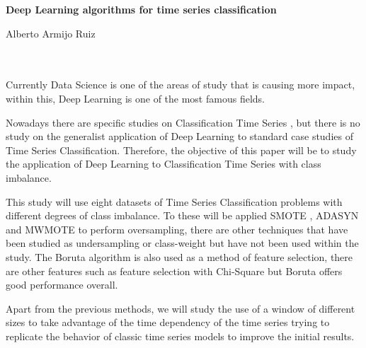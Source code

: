 {\cleardoublepage


\thispagestyle{empty}


\begin{center}
{\large\bfseries Deep Learning algorithms for time series classification}\\
\end{center}
\begin{center}
Alberto Armijo Ruiz \\
\end{center}

\\

\vspace{0.7cm}
\\

Currently Data Science is one of the areas of study that is causing more impact, within this, Deep Learning is one of the most famous fields. \newline

Nowadays there are specific studies on Classification Time Series \cite{cao2013integrated} \cite{cao2014parsimonious} \cite{geng2018cost} \cite{he2017uncertainty} \cite{karim2017lstm} \cite{liang2013effective} \cite{roychoudhury2017cost} \cite{xu2018spatio}, but there is no study on the generalist application of Deep Learning to standard case studies of Time Series Classification. Therefore, the objective of this paper will be to study the application of Deep Learning to Classification Time Series with class imbalance.\newline

This study will use eight datasets of Time Series Classification problems with different degrees of class imbalance. To these will be applied SMOTE \cite{chawla2002smote}, ADASYN \cite{he2008adasyn} and MWMOTE \cite{barua2012mwmote} to perform oversampling, there are other techniques that have been studied as undersampling or class-weight but have not been used within the study. The Boruta \cite{kursa2010boruta} algorithm is also used  as a method of feature selection, there are other features such as feature selection with Chi-Square but Boruta offers good performance overall.\newline

Apart from the previous methods, we will study the use of a window of different sizes to take advantage of the time dependency of the time series trying to replicate the behavior of classic time series models to improve the initial results.\newline

}
